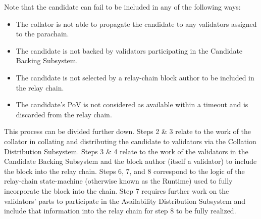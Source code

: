 Note that the candidate can fail to be included in any of the following ways:

\begin{itemize}
    \item The collator is not able to propagate the candidate to any validators
    assigned to the parachain.
    \item The candidate is not backed by validators participating in the
    Candidate Backing Subsystem.
    \item The candidate is not selected by a relay-chain block author to be
    included in the relay chain.
    \item The candidate's PoV is not considered as available within a timeout
    and is discarded from the relay chain.
\end{itemize}

This process can be divided further down. Steps 2 \& 3 relate to the work of the
collator in collating and distributing the candidate to validators via the
Collation Distribution Subsystem. Steps 3 \& 4 relate to the work of the
validators in the Candidate Backing Subsystem and the block author (itself a
validator) to include the block into the relay chain. Steps 6, 7, and 8
correspond to the logic of the relay-chain state-machine (otherwise known as the
Runtime) used to fully incorporate the block into the chain. Step 7 requires
further work on the validators' parts to participate in the Availability
Distribution Subsystem and include that information into the relay chain for
step 8 to be fully realized.
\newline

